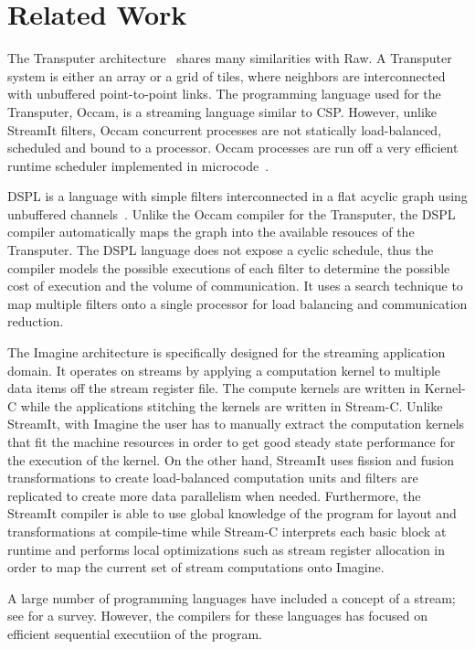 \section{Related Work}
\label{sec:related}

The Transputer architecture~\cite{transputer88} shares many
similarities with Raw.  A Transputer system is either an array or a
grid of tiles, where neighbors are interconnected with unbuffered
point-to-point links. The programming language used for the
Transputer, Occam, is a streaming language similar to CSP.  However,
unlike StreamIt filters, Occam concurrent processes are not statically
load-balanced, scheduled and bound to a processor. Occam processes are
run off a very efficient runtime scheduler implemented in
microcode~\cite{may87communicating}.

DSPL is a language with simple filters interconnected in a flat acyclic
graph using unbuffered channels~\cite{Thiel93}.  Unlike the Occam
compiler for the Transputer, the DSPL compiler automatically maps the
graph into the available resouces of the Transputer. The DSPL language
does not expose a cyclic schedule, thus the compiler models the
possible executions of each filter to determine the possible cost of
execution and the volume of communication. It uses a search technique
to map multiple filters onto a single processor for load balancing and
communication reduction. 

The Imagine architecture is specifically designed for the streaming
application domain.  It operates on streams by applying a computation
kernel to multiple data items off the stream register file.  The
compute kernels are written in Kernel-C while the applications
stitching the kernels are written in Stream-C.  Unlike StreamIt, with
Imagine the user has to manually extract the computation kernels that
fit the machine resources in order to get good steady state
performance for the execution of the kernel.  On the other hand,
StreamIt uses fission and fusion transformations to create
load-balanced computation units and filters are replicated to create
more data parallelism when needed.  Furthermore, the StreamIt compiler
is able to use global knowledge of the program for layout and
transformations at compile-time while Stream-C interprets each basic
block at runtime and performs local optimizations such as stream
register allocation in order to map the current set of stream
computations onto Imagine.

A large number of programming languages have included a concept of a
stream; see \cite{survey97} for a survey. However, the compilers for
these languages has focused on efficient sequential executiion of the
program.

% 
%
